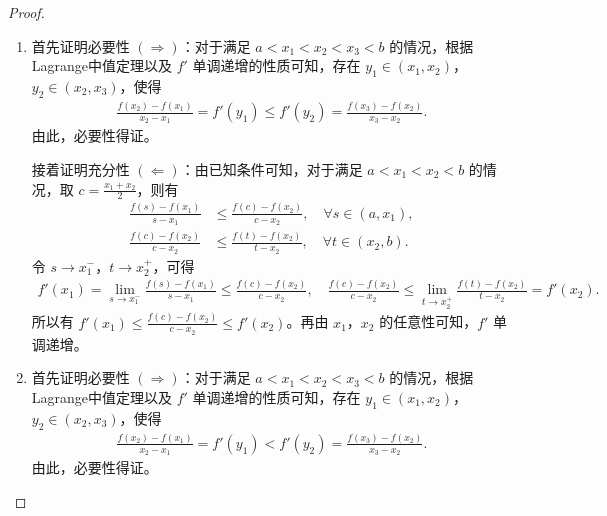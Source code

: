 \documentclass[../../main.tex]{subfiles}
\begin{document}
\begin{proof}
\begin{enumerate}[(1)]
\item 首先证明必要性 $(\Rightarrow)$：对于满足 $a < x_1 < x_2 < x_3 < b$ 的情况，根据Lagrange中值定理以及 $f'$ 单调递增的性质可知，存在 $y_1 \in (x_1, x_2)$，$y_2 \in (x_2, x_3)$，使得
\begin{align*}
\frac{f(x_2) - f(x_1)}{x_2 - x_1} = f'(y_1) \leqslant f'(y_2) = \frac{f(x_3) - f(x_2)}{x_3 - x_2}.
\end{align*}
由此，必要性得证。

接着证明充分性 $(\Leftarrow)$：由已知条件可知，对于满足 $a < x_1 < x_2 < b$ 的情况，取 $c = \frac{x_1 + x_2}{2}$，则有
\begin{align*}
\frac{f(s) - f(x_1)}{s - x_1} &\leqslant \frac{f(c) - f(x_2)}{c - x_2}, \quad \forall s \in (a, x_1), \\
\frac{f(c) - f(x_2)}{c - x_2} &\leqslant \frac{f(t) - f(x_2)}{t - x_2}, \quad \forall t \in (x_2, b).
\end{align*}
令 $s \to x_1^-$，$t \to x_2^+$，可得
\begin{align*}
f'(x_1) = \lim_{s \to x_1^-} \frac{f(s) - f(x_1)}{s - x_1} \leqslant \frac{f(c) - f(x_2)}{c - x_2}, \quad
\frac{f(c) - f(x_2)}{c - x_2} \leqslant \lim_{t \to x_2^+} \frac{f(t) - f(x_2)}{t - x_2} = f'(x_2).
\end{align*}
所以有 $f'(x_1) \leqslant \frac{f(c) - f(x_2)}{c - x_2} \leqslant f'(x_2)$。再由 $x_1$，$x_2$ 的任意性可知，$f'$ 单调递增。


\item 首先证明必要性 $(\Rightarrow)$：对于满足 $a < x_1 < x_2 < x_3 < b$ 的情况，根据Lagrange中值定理以及 $f'$ 单调递增的性质可知，存在 $y_1 \in (x_1, x_2)$，$y_2 \in (x_2, x_3)$，使得
\begin{align*}
\frac{f(x_2) - f(x_1)}{x_2 - x_1} = f'(y_1)<f'(y_2) = \frac{f(x_3) - f(x_2)}{x_3 - x_2}.
\end{align*}
由此，必要性得证。


\end{enumerate}
\end{proof}
\end{document}
